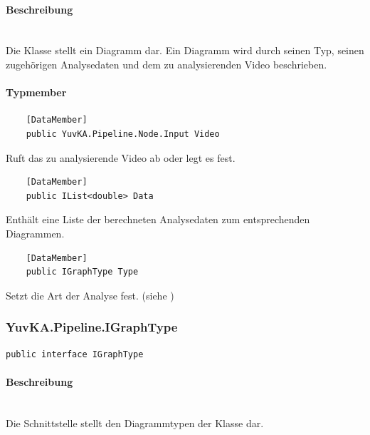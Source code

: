 \paragraph{Beschreibung}~\\
Die Klasse  stellt ein Diagramm dar. Ein Diagramm wird durch seinen Typ, seinen zugehörigen Analysedaten und dem zu analysierenden Video beschrieben.

\paragraph{Typmember}
\begin{itemize}

	\begin{verbatim}
	[DataMember]
	public YuvKA.Pipeline.Node.Input Video
	\end{verbatim}
	Ruft das zu analysierende Video ab oder legt es fest.
	
	\begin{verbatim}
	[DataMember]
	public IList<double> Data
	\end{verbatim}
	Enthält eine Liste der berechneten Analysedaten zum entsprechenden Diagrammen.
	
	\begin{verbatim}
	[DataMember]
	public IGraphType Type
	\end{verbatim}
	Setzt die Art der Analyse fest. (siehe )

\end{itemize}

\subsubsection{YuvKA.Pipeline.IGraphType}
\begin{verbatim}
public interface IGraphType
\end{verbatim}

\paragraph{Beschreibung}~\\
Die Schnittstelle  stellt den Diagrammtypen der Klasse  dar.

